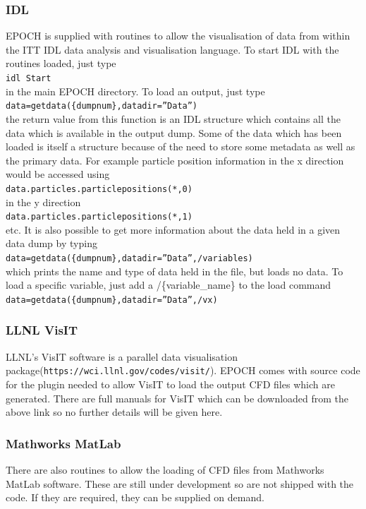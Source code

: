 \documentclass[12pt]{article}
\begin{document}
\subsubsection{IDL}
EPOCH is supplied with routines to allow the visualisation of data from within the ITT IDL data analysis and visualisation language. To start IDL with the routines loaded, just type\\
\texttt{idl Start}\\
in the main EPOCH directory. To load an output, just type\\
\texttt{data=getdata(\{dumpnum\},datadir=''Data'')}\\
the return value from this function is an IDL structure which contains all the data which is available in the output dump. Some of the data which has been loaded is itself a structure because of the need to store some metadata as well as the primary data. For example particle position information in the x direction would be accessed using\\
\texttt{data.particles.particlepositions(*,0)}\\
in the y direction\\
\texttt{data.particles.particlepositions(*,1)}\\
etc. It is also possible to get more information about the data held in a given data dump by typing\\
\texttt{data=getdata(\{dumpnum\},datadir=''Data'',/variables)}\\
which prints the name and type of data held in the file, but loads no data. To load a specific variable, just add a /\{variable\_name\} to the load command\\
\texttt{data=getdata(\{dumpnum\},datadir=''Data'',/vx)}\\
\subsubsection{LLNL VisIT}
LLNL's VisIT software is a parallel data visualisation package(\texttt{https://wci.llnl.gov/codes/visit/}). EPOCH comes with source code for the plugin needed to allow VisIT to load the output CFD files which are generated. There are full manuals for VisIT which can be downloaded from the above link so no further details will be given here.
\subsubsection{Mathworks MatLab}
There are also routines to allow the loading of CFD files from Mathworks MatLab software. These are still under development so are not shipped with the code. If they are required, they can be supplied on demand.
\end{document}
